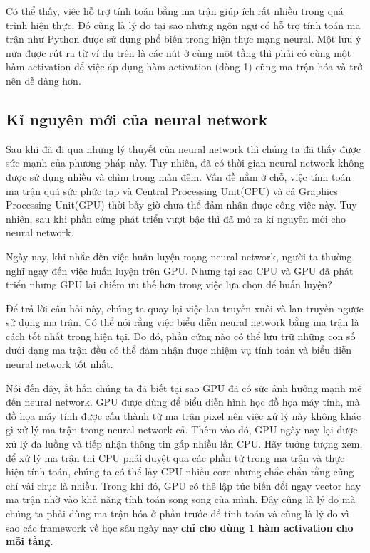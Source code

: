 Có thể thấy, việc hỗ trợ tính toán bằng ma trận giúp ích rất nhiều trong quá trình hiện thực. Đó cũng là lý do tại sao những ngôn ngữ có hỗ trợ tính toán ma trận như Python được sử dụng phổ biến trong hiện thực mạng neural. Một lưu ý nữa được rút ra từ ví dụ trên là các nút ở cùng một tầng thì phải có cùng một hàm activation để việc áp dụng hàm activation (dòng 1) cũng ma trận hóa và trở nên dễ dàng hơn.

\subsection{Kỉ nguyên mới của neural network} 
Sau khi đã đi qua những lý thuyết của neural network thì chúng ta đã thấy được sức mạnh của phương pháp này. Tuy nhiên, đã có thời gian neural network không được sử dụng nhiều và chìm trong màn đêm. Vấn đề nằm ở chỗ, việc tính toán ma trận quá sức phức tạp và Central Processing Unit(CPU) và cả Graphics Processing Unit(GPU) thời bấy giờ chưa thể đảm nhận được công việc này. Tuy nhiên, sau khi phần cứng phát triển vượt bậc thì đã mở ra kỉ nguyên mới cho neural network.

Ngày nay, khi nhắc đến việc huấn luyện mạng neural network, người ta thường nghĩ ngay đến việc huấn luyện trên GPU. Nhưng tại sao CPU và GPU đã phát triển nhưng GPU lại chiếm ưu thế hơn trong việc lựa chọn để huấn luyện?

Để trả lời câu hỏi này, chúng ta quay lại việc lan truyền xuôi và lan truyền ngược sử dụng ma trận. Có thể nói rằng việc biểu diễn neural network bằng ma trận là cách tốt nhất trong hiện tại. Do đó, phần cứng nào có thể lưu trữ những con số dưới dạng ma trận đều có thể đảm nhận được nhiệm vụ tính toán và biểu diễn neural network tốt nhất.

Nói đến đây, ắt hẳn chúng ta đã biết tại sao GPU đã có sức ảnh hưởng mạnh mẽ đến neural network. GPU được dùng để biểu diễn hình học đồ họa máy tính, mà đồ họa máy tính được cấu thành từ ma trận pixel nên việc xử lý này không khác gì xử lý ma trận trong neural network cả. Thêm vào đó, GPU ngày nay lại được xử lý đa luồng và tiếp nhận thông tin gấp nhiều lần CPU. Hãy tưởng tượng xem, để xử lý ma trận thì CPU phải duyệt qua các phần tử trong ma trận và thực hiện tính toán, chúng ta có thể lấy CPU nhiều core nhưng chắc chắn rằng cũng chỉ vài chục là nhiều. Trong khi đó, GPU có thê lập tức biến đổi ngay vector hay ma trận nhờ vào khả năng tính toán song song của mình. Đây cũng là lý do mà chúng ta phải dùng ma trận hóa ở phần trước để tính toán và cũng là lý do vì sao các framework về học sâu ngày nay \textbf{chỉ cho dùng 1 hàm activation cho mỗi tầng}.

